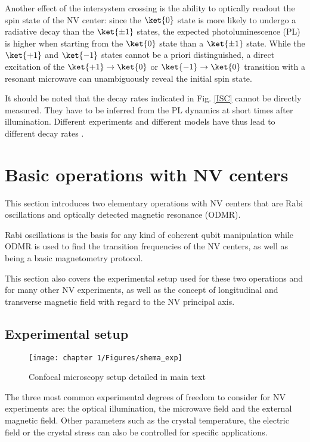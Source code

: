\documentclass[a4paper, 11pt]{book}
\begin{document}
Another effect of the intersystem crossing is the ability to optically readout the spin state of the NV center: since the $\ket{0}$ state is more likely to undergo a radiative decay than the $\ket{\pm 1}$ states, the expected photoluminescence (PL) is higher when starting from the $\ket{0}$ state than a $\ket{\pm 1}$ state. While the $\ket{+1}$ and $\ket{-1}$ states cannot be a priori distinguished, a direct excitation of the $\ket{+1} \to \ket{0}$ or $\ket{-1} \to \ket{0}$ transition with a resonant microwave can unambiguously reveal the initial spin state.

It should be noted that the decay rates indicated in Fig. \ref{ISC} cannot be directly measured. They have to be inferred from the PL dynamics at short times after illumination. Different experiments and different models have thus lead to different decay rates \citep{duarte2021effect}. 


\section{Basic operations with NV centers}

This section introduces two elementary operations with NV centers that are Rabi oscillations and optically detected magnetic resonance (ODMR).

Rabi oscillations is the basis for any kind of coherent qubit manipulation while ODMR is used to find the transition frequencies of the NV centers, as well as being a basic magnetometry protocol.

This section also covers the experimental setup used for these two operations and for many other NV experiments, as well as the concept of longitudinal and transverse magnetic field with regard to the NV principal axis.

\subsection{Experimental setup}
\label{Sec setup cahp 1}
\begin{figure}[h!]
\centering
\texttt{[image: chapter 1/Figures/shema\_exp]}
\caption{Confocal microscopy setup detailed in main text}
\label{setup ch1}
\end{figure}
The three most common experimental degrees of freedom to consider for NV experiments are: the optical illumination, the microwave field and the external magnetic field. Other parameters such as the crystal temperature, the electric field or the crystal stress can also be controlled for specific applications.
\end{document}
